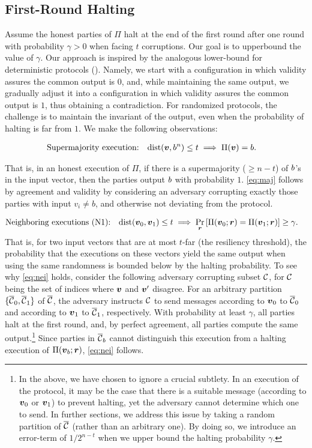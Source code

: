 \subsection{First-Round Halting}\label{sec:technique:1}
Assume the honest parties of $\Pi$ halt
\ifdefined\IsFullVersion
at the end of the first round
\else
after one round
\fi
with probability $\gamma>0$ when facing $t$ corruptions.
Our goal is to upperbound the value of $\gamma$. Our approach is inspired by the analogous lower-bound for deterministic protocols (\cf \cite{FL82,DS83}). Namely, we start with a configuration in which validity assures the common output is $0$, and, while maintaining the same output, we gradually adjust it into a configuration in which validity assures the common output is $1$, thus obtaining a contradiction. For  randomized protocols, the challenge is to maintain the invariant of the output, even when the probability of halting  is far from $1$.  We make the following observations:

\begin{align} \label{eq:maj}
&\text{Supermajority execution:}    \quad  \mathrm{dist}({ \boldsymbol{v}},b^n) \le t \implies \Pi({ \boldsymbol{v}})=b.
\end{align}

That is, in an honest execution of $\Pi$, if there is a supermajority ($\ge n-t$) of $b$'s in the input vector, then the parties output $b$ with probability $1$.  \cref{eq:maj} follows by agreement and validity by considering an adversary corrupting exactly those parties with input $v_i\neq b$, and otherwise not deviating from the protocol.


\begin{align}\label{eq:nei}
&\text{Neighboring executions (N1):} \quad \mathrm{dist}({ \boldsymbol{v}}_0,{ \boldsymbol{v}}_1)\le t \implies \Pr_{{ \boldsymbol{r}}}\left[\Pi({ \boldsymbol{v}}_0;{ \boldsymbol{r}})=\Pi({ \boldsymbol{v}}_1;{ \boldsymbol{r}})\right]\ge \gamma.
\end{align}
That is, for two input vectors that are at most $t$-far (\ie the resiliency  threshold), the probability that the executions on these vectors yield the same output when using  the same randomness is bounded below by the halting probability.  To see why \cref{eq:nei} holds, consider the following adversary corrupting subset $\mathcal{C}$, for $\mathcal{C}$ being the set of indices where ${ \boldsymbol{v}}$ and ${ \boldsymbol{v}}'$ disagree. For an arbitrary partition $\{\overline{\mathcal{C}}_0,\overline{\mathcal{C}}_1\}$ of $\overline{\mathcal{C}}$, the adversary instructs $\mathcal{C}$ to send messages according to ${ \boldsymbol{v}}_0$ to $\overline{\mathcal{C}}_0$ and according to ${ \boldsymbol{v}}_1$ to $\overline{\mathcal{C}}_1$, respectively.  With probability at least $\gamma$, all parties halt at the first round, and, by perfect agreement, all parties compute the same output.\footnote{In the above, we have chosen to ignore a crucial subtlety. In an execution of the protocol, it may be the case that there is a suitable message (according to ${ \boldsymbol{v}}_0$ or ${ \boldsymbol{v}}_1$) to prevent halting, yet the adversary cannot determine which one to send. In further sections, we address this issue by taking a random partition of $\overline{\mathcal{C}}$ (rather than an arbitrary one). By doing so, we introduce an error-term of $1/2^{n-t}$ when we upper bound the halting probability $\gamma$.} Since parties in $\overline{\mathcal{C}}_b$ cannot distinguish this execution from a halting execution of $\Pi({ \boldsymbol{v}}_b;{ \boldsymbol{r}})$, \cref{eq:nei} follows.


